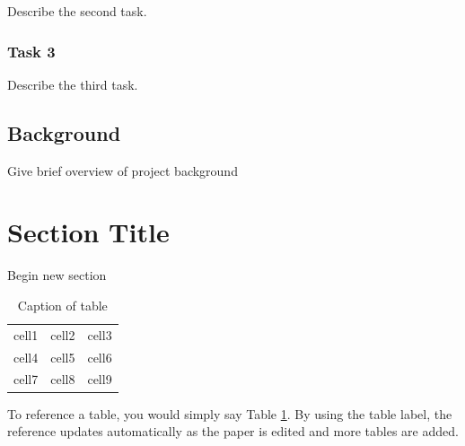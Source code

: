 \documentclass{article}
\begin{document}
\begin{doublespacing}
\noindent Describe the second task. 

\subsubsection{Task 3} %

\noindent Describe the third task. 

\subsection{Background} %

\noindent Give brief overview of project background

\newpage %
\section{Section Title}

\noindent Begin new section


\begin{table}[!tb] %
    \begin{center}
        \begin{tabular}{ |c|c|c| } 
            \hline
            cell1 & cell2 & cell3 \\ 
            cell4 & cell5 & cell6 \\ 
            cell7 & cell8 & cell9 \\ 
            \hline
        \end{tabular}
        \caption{Caption of table} %
        \label{table:label_of_table} %
    \end{center}
\end{table}

\par To reference a table, you would simply say Table \ref{table:label_of_table}. By using the table label, the reference updates automatically as the paper is edited and more tables are added.


\end{doublespacing}
\end{document}
